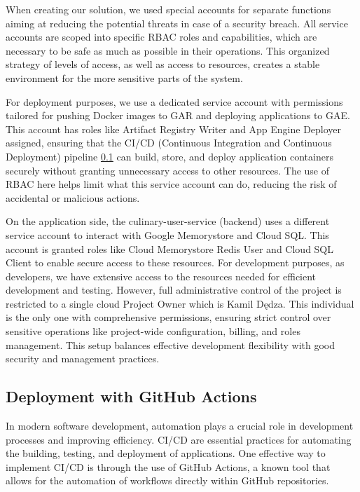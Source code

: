 When creating our solution, we used special accounts for separate functions aiming at reducing the potential threats in case of a security breach. All service accounts are scoped into specific RBAC roles and capabilities, which are necessary to be safe as much as possible in their operations. This organized strategy of levels of access, as well as access to resources, creates a stable environment for the more sensitive parts of the system.

For deployment purposes, we use a dedicated service account with permissions tailored for pushing Docker images to GAR and deploying applications to GAE. This account has roles like Artifact Registry Writer and App Engine Deployer assigned, ensuring that the CI/CD (Continuous Integration and Continuous Deployment) pipeline \ref{subsec:deployment-github-actions} can build, store, and deploy application containers securely without granting unnecessary access to other resources. The use of RBAC here helps limit what this service account can do, reducing the risk of accidental or malicious actions.

On the application side, the culinary-user-service (backend) uses a different service account to interact with Google Memorystore and Cloud SQL. This account is granted roles like Cloud Memorystore Redis User and Cloud SQL Client  to enable secure access to these resources. For development purposes, as developers, we have extensive access to the resources needed for efficient development and testing. However, full administrative control of the project is restricted to a single cloud Project Owner which is Kamil Dędza. This individual is the only one with comprehensive permissions, ensuring strict control over sensitive operations like project-wide configuration, billing, and roles management. This setup balances effective development flexibility with good security and management practices.

\subsection{Deployment with GitHub Actions}
\label{subsec:deployment-github-actions}

In modern software development, automation plays a crucial role in development processes and improving efficiency. CI/CD are essential practices for automating the building, testing, and deployment of applications. One effective way to implement CI/CD is through the use of GitHub Actions, a known tool that allows for the automation of workflows directly within GitHub repositories.


